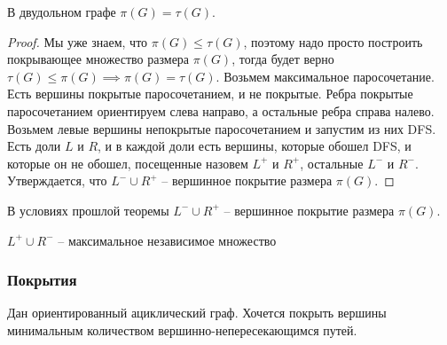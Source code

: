 \begin{theorem}[Кёнига]
    В двудольном графе $\pi(G) = \tau(G)$.
\end{theorem}

\begin{proof}
    Мы уже знаем, что $\pi(G) \leq \tau(G)$, поэтому надо просто построить покрывающее множество размера $\pi(G)$, тогда будет верно $\tau(G) \leq \pi(G) \implies \pi(G) = \tau(G)$. Возьмем максимальное паросочетание. Есть вершины покрытые паросочетанием, и не покрытые. Ребра покрытые паросочетанием ориентируем слева направо, а остальные ребра справа налево. Возьмем левые вершины непокрытые паросочетанием и запустим из них DFS. Есть доли $L$ и $R$, и в каждой доли есть вершины, которые обошел DFS, и которые он не обошел, посещенные назовем $L^{+}$ и $R^{+}$, остальные $L^{-}$ и $R^{-}$. Утверждается, что $L^{-} \cup R^{+}$ -- вершинное покрытие размера $\pi(G)$.
\end{proof}

\begin{proposition}
    В условиях прошлой теоремы $L^{-} \cup R^{+}$ -- вершинное покрытие размера $\pi(G)$.
\end{proposition}

    

\begin{corollary}
    $L^{+} \cup R^{-}$ -- максимальное независимое множество
\end{corollary}

\subsubsection{Покрытия}

\begin{problem}
    Дан ориентированный ациклический граф. Хочется покрыть вершины минимальным количеством вершинно-непересекающимся путей.
\end{problem}

